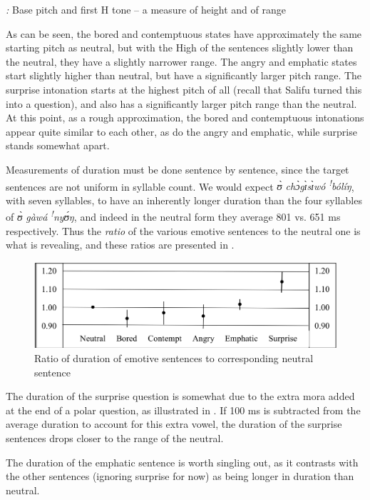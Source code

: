 \documentclass[output=paper]{langsci/langscibook}
\begin{document}
\emph{\textup{:}} Base pitch and first H tone -- a measure of height and of range

As can be seen, the bored and contemptuous states have approximately the same starting pitch as neutral, but with the High of the sentences slightly lower than the neutral, they have a slightly narrower range.  The angry and emphatic states start slightly higher than neutral, but have a significantly larger pitch range.  The surprise intonation starts at the highest pitch of all (recall that Salifu turned this into a question), and also has a significantly larger pitch range than the neutral. At this point, as a rough approximation, the bored and contemptuous intonations appear quite similar to each other, as do the angry and emphatic, while surprise stands somewhat apart. 

Measurements of duration must be done sentence by sentence, since the target sentences are not uniform in syllable count. We would expect \textit{ʊ̀ chɔ̀gɪ̀sɪ̀wó \textsuperscript{!}bólíŋ}, with seven syllables, to have an inherently longer duration than the four syllables of \textit{ʊ̀ gàwá  \textsuperscript{!}nyʊ́ŋ}, and indeed in the neutral form they average 801 vs. 651 ms respectively. Thus the \emph{ratio} of the various emotive sentences to the neutral one is what is revealing, and these ratios are presented in . 

\begin{figure}[h]
\includegraphics[width=\textwidth]{figures/cahillfig3}
\caption{Ratio of duration of emotive sentences to corresponding neutral sentence}
\label{fig:3.cahill}
\end{figure}

The duration of the surprise question is somewhat due to the extra mora added at the end of a polar question, as illustrated in . If 100 ms is subtracted from the average duration to account for this extra vowel, the duration of the surprise sentences drops closer to the range of the neutral. 

The duration of the emphatic sentence is worth singling out, as it contrasts with the other sentences (ignoring surprise for now) as being longer in duration than neutral. 
\end{document}
